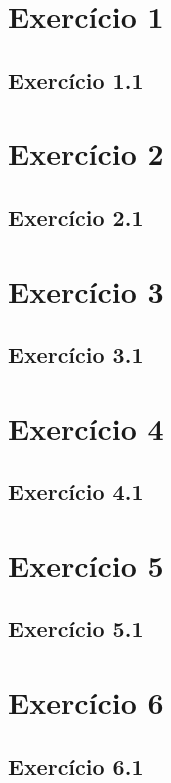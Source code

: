\documentclass[a4paper]{article}
\title{\documentTitle}
\author{\documentAuthors}
\begin{document}
\maketitle
\cleardoublepage

\tableofcontents
\cleardoublepage

\setlength{\parindent}{1cm}
\setlength{\parskip}{0.3cm}

\section{Exercício 1}
\subsection{Exercício 1.1}
\indent \indent 



\section{Exercício 2}
\subsection{Exercício 2.1}
\indent \indent 



\section{Exercício 3}
\subsection{Exercício 3.1}
\indent \indent 



\section{Exercício 4}
\subsection{Exercício 4.1}
\indent \indent 



\section{Exercício 5}
\subsection{Exercício 5.1}
\indent \indent 



\section{Exercício 6}
\subsection{Exercício 6.1}
\indent \indent 

\end{document}
